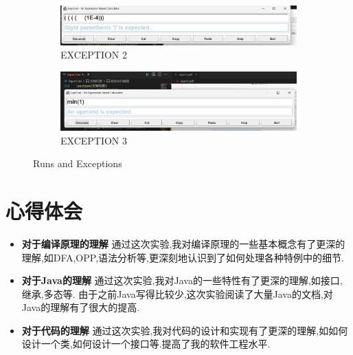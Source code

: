 \documentclass{article}
\begin{document}
\begin{figure}[htbp]
    \begin{subfigure}[b]{0.9\textwidth}
        \centering
        \includegraphics[width=\linewidth]{image28.png}
        \caption{EXCEPTION 2}
        \label{fig:image28}
    \end{subfigure}
    \hfill
    \begin{subfigure}[b]{0.9\textwidth}
        \centering
        \includegraphics[width=\linewidth]{image29.png}
        \caption{EXCEPTION 3}
        \label{fig:image29}
    \end{subfigure}
    
    \caption{Runs and Exceptions}
    \label{fig:combined}
\end{figure}
\section{心得体会}
\begin{itemize}
    \item \textbf{对于编译原理的理解} 通过这次实验,我对编译原理的一些基本概念有了更深的理解,如DFA,OPP,语法分析等,更深刻地认识到了如何处理各种特例中的细节.
    \item \textbf{对于Java的理解} 通过这次实验,我对Java的一些特性有了更深的理解,如接口,继承,多态等. 由于之前Java写得比较少,这次实验阅读了大量Java的文档,对Java的理解有了很大的提高.
    \item \textbf{对于代码的理解} 通过这次实验,我对代码的设计和实现有了更深的理解,如如何设计一个类,如何设计一个接口等.提高了我的软件工程水平.
\end{itemize}
\end{document}
